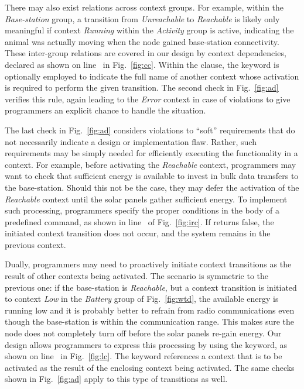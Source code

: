 There may also exist relations across context groups. For example,
within the \emph{Base-station} group, a transition from
\emph{Unreachable} to \emph{Reachable} is likely only meaningful if
context \emph{Running} within the \emph{Activity} group is active,
indicating the animal was actually moving when the node gained
base-station connectivity. These inter-group relations are covered in
our design by context dependencies, declared as shown on
line~ in Fig.~\ref{fig:cc}. Within the
 clause, the keyword  is optionally
employed to indicate the full name of another context whose activation
is required to perform the given transition. The second check in
Fig.~\ref{fig:ad} verifies this rule, again leading to the
\emph{Error} context in case of violations to give programmers an
explicit chance to handle the situation.

The last check in Fig.~\ref{fig:ad} considers violations to ``soft''
requirements that do not necessarily indicate a design or
implementation flaw. Rather, such requirements may be simply needed
for efficiently executing the functionality in a context. For example,
before activating the \emph{Reachable} context, programmers may want
to check that sufficient energy is available to invest in bulk data
transfers to the base-station. Should this not be the case, they may
defer the activation of the \emph{Reachable} context until the solar
panels gather sufficient energy. To implement such processing, \conesc
programmers specify the proper conditions in the body of a predefined
 command, as shown in line~ of
Fig.~\ref{fig:irc}. If  returns false, the initiated
context transition does not occur, and the system remains in the
previous context.


Dually, programmers may need to proactively initiate context
transitions as the result of other contexts being activated. The
scenario is symmetric to the previous one: if the base-station is
\emph{Reachable}, but a context transition is initiated to context
\emph{Low} in the \emph{Battery} group of Fig.~\ref{fig:wtd}, the
available energy is running low and it is probably better to refrain
from radio communications even though the base-station is within the
communication range. This makes sure the node does not completely turn
off before the solar panels re-gain energy. Our design allows
programmers to express this processing by using the 
keyword, as shown on line~ in Fig.~\ref{fig:lc}. The
 keyword references a context that is to be activated
as the result of the enclosing context being activated. The same
checks shown in Fig.~\ref{fig:ad} apply to this type of transitions as
well.


